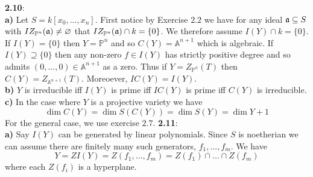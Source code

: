 \documentclass[12pt]{article}
\numberwithin{thm}{subsection}
\numberwithin{defn}{subsection}
\numberwithin{lemma}{subsection}
\numberwithin{example}{subsection}
\numberwithin{notation}{subsection}
\numberwithin{cor}{subsection}
\numberwithin{remark}{subsection}
\numberwithin{condition}{subsection}
\numberwithin{question}{subsection}
\numberwithin{construction}{subsection}
\numberwithin{construction}{subsection}
\numberwithin{construction}{subsection}
\newcommand{\bb}[1]{\mathbb{#1}}
\begin{document}
%
\textbf{2.10}:\\
\textbf{a)} Let $S = k[x_0,...,x_n]$. First notice by Exercise $2.2$ we have for any ideal $\frak{a} \subseteq S$ with $IZ_{\bb{P}^n}(\frak{a}) \neq \varnothing$ that $IZ_{\bb{P}^n}(\frak{a}) \cap k = \lbrace 0 \rbrace $. We therefore assume $I(Y) \cap k = \lbrace 0 \rbrace$. If $I(Y) = \lbrace 0\rbrace$ then $Y = \bb{P}^n$ and so $C(Y) = \bb{A}^{n+1}$ which is algebraic. If $I(Y) \supseteq \lbrace 0 \rbrace$ then any non-zero $f \in I(Y)$ has strictly positive degree and so admits $(0,...,0) \in \bb{A}^{n+1}$ as a zero. Thus if $Y = Z_{\bb{P}^n}(T)$ then $C(Y) = Z_{\bb{A}^{n+1}}(T)$. Moreoever, $IC(Y) = I(Y)$.\\
\textbf{b)} $Y$ is irreducible iff $I(Y)$ is prime iff $IC(Y)$ is prime iff $C(Y)$ is irreducible.\\
\textbf{c)} In the case where $Y$ is a projective variety we have
\[\operatorname{dim}C(Y) = \operatorname{dim}S(C(Y)) = \operatorname{dim}S(Y) = \operatorname{dim}Y + 1\]
For the general case, we use exercise $2.7$.
%
\textbf{2.11}:\\
\textbf{a)} Say $I(Y)$ can be generated by linear polynomials. Since $S$ is noetherian we can assume there are finitely many such generators, $f_1,...,f_m$. We have
\[Y = ZI(Y) = Z(f_1,...,f_m) = Z(f_1) \cap ... \cap Z(f_m)\]
where each $Z(f_i)$ is a hyperplane.\\
\end{document}
